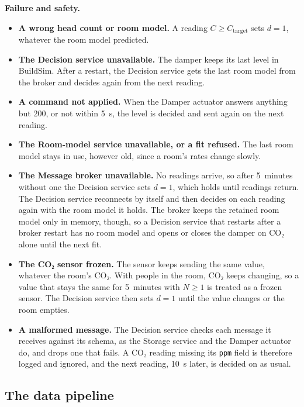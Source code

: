 \documentclass[11pt]{article}
\providecommand{\tightlist}{\setlength{\itemsep}{0pt}\setlength{\parskip}{0pt}}
\begin{document}
\textbf{Failure and safety.}
\begin{itemize}
\tightlist
\item
  \textbf{A wrong head count or room model.} A reading
  $C \geq C_\text{target}$ sets $d = 1$, whatever the room model predicted.
\item
  \textbf{The Decision service unavailable.} The damper keeps its last
  level in BuildSim. After a restart, the Decision service gets the last
  room model from the broker and decides again from the next reading.
\item
  \textbf{A command not applied.} When the Damper actuator answers
  anything but 200, or not within 5~s, the level is decided and sent
  again on the next reading.
\item
  \textbf{The Room-model service unavailable, or a fit refused.} The last
  room model stays in use, however old, since a room's rates change
  slowly.
\item
  \textbf{The Message broker unavailable.} No readings arrive, so after
  5~minutes without one the Decision service sets $d = 1$, which holds
  until readings return. The Decision service reconnects by itself and
  then decides on each reading again with the room model it holds. The
  broker keeps the retained room model only in memory, though, so a
  Decision service that restarts after a broker restart has no room
  model and opens or closes the damper on CO₂ alone until the next fit.
\item
  \textbf{The CO₂ sensor frozen.} The sensor keeps sending the same
  value, whatever the room's CO₂. With people in the room, CO₂ keeps
  changing, so a value that stays the same for 5~minutes with
  $N \geq 1$ is treated as a frozen sensor. The Decision service then
  sets $d = 1$ until the value changes or the room empties.
\item
  \textbf{A malformed message.} The Decision service checks each
  message it receives against its schema, as the Storage service and
  the Damper actuator do, and drops one that fails. A CO₂ reading
  missing its \texttt{ppm} field is therefore logged and ignored, and
  the next reading, 10~s later, is decided on as usual.
\end{itemize}

\subsection{The data pipeline}\label{sec:pipeline}
\end{document}
